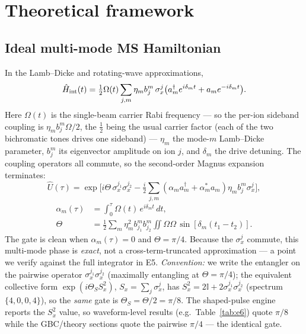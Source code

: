 \documentclass[aps,prapplied,twocolumn,superscriptaddress,floatfix,nofootinbib]{revtex4-2}
\begin{document}
\section{Theoretical framework}
\subsection{Ideal multi-mode MS Hamiltonian}
In the Lamb--Dicke and rotating-wave approximations,
\begin{equation}
\hat H_{\rm int}(t)=\tfrac12\Omega(t)\sum_{j,m}\eta_m b^m_j\,\sigma_x^j
\big(a_m^\dagger e^{i\delta_m t}+a_m e^{-i\delta_m t}\big).
\end{equation}
Here $\Omega(t)$ is the single-beam carrier Rabi frequency --- so the per-ion sideband coupling is
$\eta_m b^m_j\Omega/2$, the $\tfrac12$ being the usual carrier factor (each of the two bichromatic
tones drives one sideband) --- $\eta_m$ the mode-$m$ Lamb--Dicke parameter, $b^m_j$ its eigenvector
amplitude on ion $j$, and $\delta_m$ the drive detuning. The coupling operators all commute, so the
second-order Magnus expansion terminates:
\begin{equation}
\hat U(\tau)=\exp\!\Big[i\Theta\,\sigma_x^{j_1}\sigma_x^{j_2}
-\tfrac{i}{2}\!\sum_{j,m}(\alpha_m a_m^\dagger+\alpha_m^* a_m)\eta_m b^m_j\sigma_x^j\Big],
\end{equation}
\begin{equation}
\begin{aligned}
\alpha_m(\tau)&=\int_0^\tau\!\Omega(t)\,e^{i\delta_m t}\,dt,\\
\Theta&=\tfrac12\sum_m\eta_m^2 b^m_{j_1}b^m_{j_2}\!\iint\!\Omega\Omega\,\sin[\delta_m(t_1{-}t_2)].
\end{aligned}
\end{equation}
The gate is clean when $\alpha_m(\tau)=0$ and $\Theta=\pi/4$. Because the $\sigma_x^j$ commute,
this multi-mode phase is \emph{exact}, not a cross-term-truncated approximation --- a point we
verify against the full integrator in E5.
\emph{Convention:} we write the entangler on the pairwise operator $\sigma_x^{j_1}\sigma_x^{j_2}$
(maximally entangling at $\Theta=\pi/4$); the equivalent collective form $\exp(i\Theta_S S_x^2)$,
$S_x{=}\sum_j\sigma_x^j$, has $S_x^2{=}2\mathbb I{+}2\sigma_x^{j_1}\sigma_x^{j_2}$ (spectrum
$\{4,0,0,4\}$), so the \emph{same} gate is $\Theta_S{=}\Theta/2{=}\pi/8$. The shaped-pulse engine
reports the $S_x^2$ value, so waveform-level results (e.g.\ Table~\ref{tab:e6}) quote $\pi/8$ while
the GBC/theory sections quote the pairwise $\pi/4$ --- the identical gate.
\end{document}
